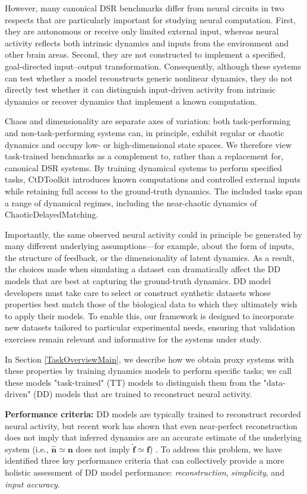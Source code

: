 \documentclass{article}
\begin{document}
However, many canonical DSR benchmarks differ from neural circuits in two respects that are particularly important for studying neural computation. First, they are autonomous or receive only limited external input, whereas neural activity reflects both intrinsic dynamics and inputs from the environment and other brain areas. Second, they are not constructed to implement a specified, goal-directed input--output transformation. Consequently, although these systems can test whether a model reconstructs generic nonlinear dynamics, they do not directly test whether it can distinguish input-driven activity from intrinsic dynamics or recover dynamics that implement a known computation.

Chaos and dimensionality are separate axes of variation: both task-performing and non-task-performing systems can, in principle, exhibit regular or chaotic dynamics and occupy low- or high-dimensional state spaces. We therefore view task-trained benchmarks as a complement to, rather than a replacement for, canonical DSR systems. By training dynamical systems to perform specified tasks, CtDToolkit introduces known computations and controlled external inputs while retaining full access to the ground-truth dynamics. The included tasks span a range of dynamical regimes, including the near-chaotic dynamics of ChaoticDelayedMatching.

Importantly, the same observed neural activity could in principle be generated by many different underlying assumptions—for example, about the form of inputs, the structure of feedback, or the dimensionality of latent dynamics. As a result, the choices made when simulating a dataset can dramatically affect the DD models that are best at capturing the ground-truth dynamics. DD model developers must take care to select or construct synthetic datasets whose properties best match those of the biological data to which they ultimately wish to apply their models. To enable this, our framework is designed to incorporate new datasets tailored to particular experimental needs, ensuring that validation exercises remain relevant and informative for the systems under study.

In Section \ref{TaskOverviewMain}, we describe how we obtain proxy systems with these properties by training dynamics models to perform specific tasks; we call these models "task-trained" (TT) models to distinguish them from the "data-driven" (DD) models that are trained to reconstruct neural activity.

\textbf{Performance criteria:\label{sec:perf_criteria}}
DD models are typically trained to reconstruct recorded neural activity, but recent work has shown that even near-perfect reconstruction does not imply that inferred dynamics are an accurate estimate of the underlying system (i.e., $\mathbf{\hat{n}} \simeq \mathbf{n}$ does not imply $\mathbf{\hat{f}} \simeq \mathbf{f}$) \cite{Genkin2020-ow, sedler_expressive_2022, qian2024partial}. To address this problem, we have identified three key performance criteria that can collectively provide a more holistic assessment of DD model performance: \textit{reconstruction}, \textit{simplicity}, and \textit{input accuracy}.
\end{document}

